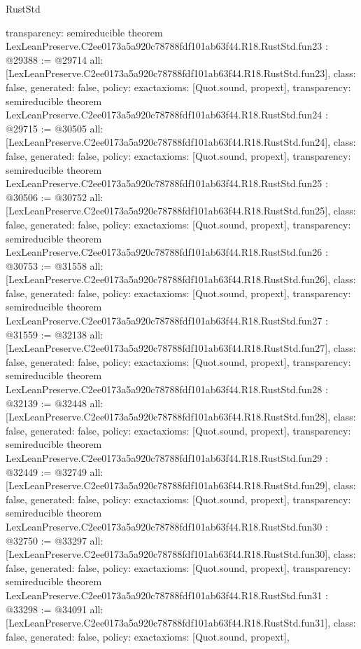 \begin{lexlean}{RustStd}
\begin{coremodule}
{  transparency: semireducible
}
theorem LexLeanPreserve.C2ee0173a5a920c78788fdf101ab63f44.R18.RustStd.fun23 : @29388 := @29714 {
  all: [LexLeanPreserve.C2ee0173a5a920c78788fdf101ab63f44.R18.RustStd.fun23],
  class: false,
  generated: false,
  policy: exact{axioms: [Quot.sound, propext]},
  transparency: semireducible
}
theorem LexLeanPreserve.C2ee0173a5a920c78788fdf101ab63f44.R18.RustStd.fun24 : @29715 := @30505 {
  all: [LexLeanPreserve.C2ee0173a5a920c78788fdf101ab63f44.R18.RustStd.fun24],
  class: false,
  generated: false,
  policy: exact{axioms: [Quot.sound, propext]},
  transparency: semireducible
}
theorem LexLeanPreserve.C2ee0173a5a920c78788fdf101ab63f44.R18.RustStd.fun25 : @30506 := @30752 {
  all: [LexLeanPreserve.C2ee0173a5a920c78788fdf101ab63f44.R18.RustStd.fun25],
  class: false,
  generated: false,
  policy: exact{axioms: [Quot.sound, propext]},
  transparency: semireducible
}
theorem LexLeanPreserve.C2ee0173a5a920c78788fdf101ab63f44.R18.RustStd.fun26 : @30753 := @31558 {
  all: [LexLeanPreserve.C2ee0173a5a920c78788fdf101ab63f44.R18.RustStd.fun26],
  class: false,
  generated: false,
  policy: exact{axioms: [Quot.sound, propext]},
  transparency: semireducible
}
theorem LexLeanPreserve.C2ee0173a5a920c78788fdf101ab63f44.R18.RustStd.fun27 : @31559 := @32138 {
  all: [LexLeanPreserve.C2ee0173a5a920c78788fdf101ab63f44.R18.RustStd.fun27],
  class: false,
  generated: false,
  policy: exact{axioms: [Quot.sound, propext]},
  transparency: semireducible
}
theorem LexLeanPreserve.C2ee0173a5a920c78788fdf101ab63f44.R18.RustStd.fun28 : @32139 := @32448 {
  all: [LexLeanPreserve.C2ee0173a5a920c78788fdf101ab63f44.R18.RustStd.fun28],
  class: false,
  generated: false,
  policy: exact{axioms: [Quot.sound, propext]},
  transparency: semireducible
}
theorem LexLeanPreserve.C2ee0173a5a920c78788fdf101ab63f44.R18.RustStd.fun29 : @32449 := @32749 {
  all: [LexLeanPreserve.C2ee0173a5a920c78788fdf101ab63f44.R18.RustStd.fun29],
  class: false,
  generated: false,
  policy: exact{axioms: [Quot.sound, propext]},
  transparency: semireducible
}
theorem LexLeanPreserve.C2ee0173a5a920c78788fdf101ab63f44.R18.RustStd.fun30 : @32750 := @33297 {
  all: [LexLeanPreserve.C2ee0173a5a920c78788fdf101ab63f44.R18.RustStd.fun30],
  class: false,
  generated: false,
  policy: exact{axioms: [Quot.sound, propext]},
  transparency: semireducible
}
theorem LexLeanPreserve.C2ee0173a5a920c78788fdf101ab63f44.R18.RustStd.fun31 : @33298 := @34091 {
  all: [LexLeanPreserve.C2ee0173a5a920c78788fdf101ab63f44.R18.RustStd.fun31],
  class: false,
  generated: false,
  policy: exact{axioms: [Quot.sound, propext]},
}
\end{coremodule}
\end{lexlean}
